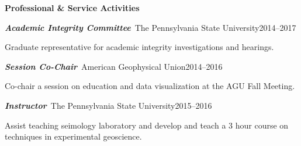 \documentclass[11pt]{psuthesis}
\begin{document}
{\begin{singlespace}
\medskip

\large


%
%

\centerline{{\bf Professional \& Service Activities}}
\normalsize

\smallskip

\par\noindent
\textbf{\textit{Academic Integrity Committee}}\, The Pennsylvania State University\hfill 2014--2017

\smallskip

\par\noindent
\hspace{0.10truein}  
\parbox{5.7truein}{
\par\noindent
Graduate representative for academic integrity investigations and hearings.
}


\smallskip

\par\noindent
\textbf{\textit{Session Co-Chair}}\, American Geophysical Union\hfill 2014--2016

\smallskip

\par\noindent
\hspace{0.10truein}  
\parbox{5.7truein}{
\par\noindent
Co-chair a session on education and data visualization at the AGU Fall Meeting.
}



\smallskip

\par\noindent
\textbf{\textit{Instructor}}\, The Pennsylvania State University\hfill 2015--2016

\smallskip

\par\noindent
\hspace{0.10truein}  
\parbox{5.7truein}{
\par\noindent
Assist teaching seimology laboratory and develop and teach a 3 hour course on techniques in experimental geoscience.
}



\end{singlespace}
}
\end{document}

